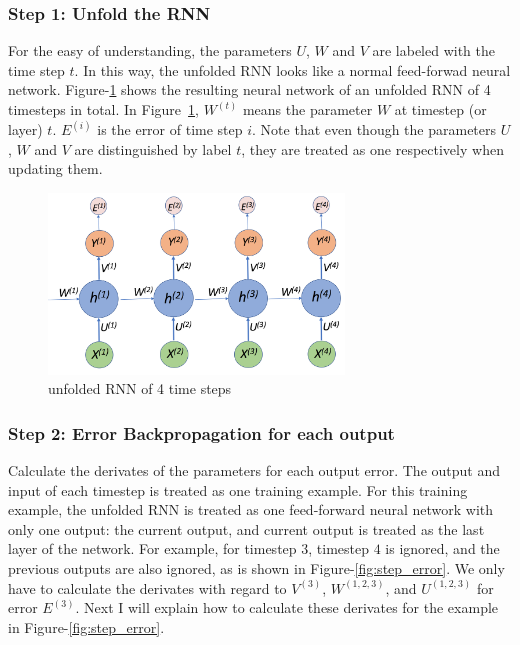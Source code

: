 \documentclass{article}
\begin{document}

\subsubsection{Step 1: Unfold the RNN}
For the easy of understanding, the parameters $U$, $W$ and $V$  are labeled with the time step $t$.  In this way, the unfolded RNN looks like a normal
feed-forwad neural network. Figure-\ref{fig:rnn4} shows the resulting neural network of an unfolded RNN of 4 timesteps in total. 
In Figure~\ref{fig:rnn4}, $W^{(t)}$ means the parameter $W$ at timestep (or layer) $t$. $E^{(i)}$ is the error of time step $i$.  Note that even though the parameters $U$, $W$ and $V$  are distinguished by label $t$,  they are treated as one respectively when updating them.

\begin{figure}[htbp]
	\centering
	\includegraphics[width=0.7\textwidth]{unfold-rnn}
	\caption{unfolded RNN of 4 time steps}
	\label{fig:rnn4}
\end{figure}


\subsubsection{Step 2: Error Backpropagation for each output}\label{sec:bptt}
Calculate the derivates of the parameters for each output error. The output and input of each timestep is treated as one training example. For this training example, the unfolded RNN is treated as one feed-forward neural network with only one output: the current output, and current output is treated as the last layer of the network.  For example, for timestep $3$, timestep $4$  is ignored, and the previous outputs are also ignored, as is shown in Figure-\ref{fig:step_error}. We only have to calculate the derivates with regard to $V^{(3)}$,  $W^{(1,2,3)}$, and $U^{(1,2,3)}$ for error $E^{(3)}$. Next I will explain how to calculate these derivates for the example in Figure-\ref{fig:step_error}.
\end{document}
